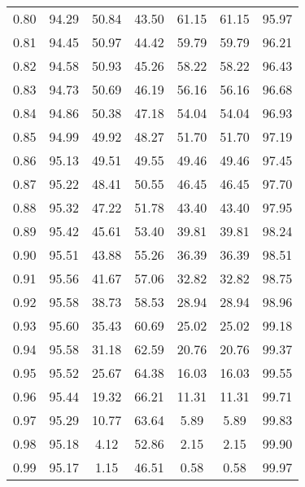 \begin{tabular}{|c|c|c|c|c|c|c|}
      0.80 &     94.29 &     50.84 &      43.50 &   61.15 &      61.15 &         95.97 \\
      0.81 &     94.45 &     50.97 &      44.42 &   59.79 &      59.79 &         96.21 \\
      0.82 &     94.58 &     50.93 &      45.26 &   58.22 &      58.22 &         96.43 \\
      0.83 &     94.73 &     50.69 &      46.19 &   56.16 &      56.16 &         96.68 \\
      0.84 &     94.86 &     50.38 &      47.18 &   54.04 &      54.04 &         96.93 \\
      0.85 &     94.99 &     49.92 &      48.27 &   51.70 &      51.70 &         97.19 \\
      0.86 &     95.13 &     49.51 &      49.55 &   49.46 &      49.46 &         97.45 \\
      0.87 &     95.22 &     48.41 &      50.55 &   46.45 &      46.45 &         97.70 \\
      0.88 &     95.32 &     47.22 &      51.78 &   43.40 &      43.40 &         97.95 \\
      0.89 &     95.42 &     45.61 &      53.40 &   39.81 &      39.81 &         98.24 \\
      0.90 &     95.51 &     43.88 &      55.26 &   36.39 &      36.39 &         98.51 \\
      0.91 &     95.56 &     41.67 &      57.06 &   32.82 &      32.82 &         98.75 \\
      0.92 &     95.58 &     38.73 &      58.53 &   28.94 &      28.94 &         98.96 \\
      0.93 &     95.60 &     35.43 &      60.69 &   25.02 &      25.02 &         99.18 \\
      0.94 &     95.58 &     31.18 &      62.59 &   20.76 &      20.76 &         99.37 \\
      0.95 &     95.52 &     25.67 &      64.38 &   16.03 &      16.03 &         99.55 \\
      0.96 &     95.44 &     19.32 &      66.21 &   11.31 &      11.31 &         99.71 \\
      0.97 &     95.29 &     10.77 &      63.64 &    5.89 &       5.89 &         99.83 \\
      0.98 &     95.18 &      4.12 &      52.86 &    2.15 &       2.15 &         99.90 \\
      0.99 &     95.17 &      1.15 &      46.51 &    0.58 &       0.58 &         99.97 \\
\bottomrule
\end{tabular}
